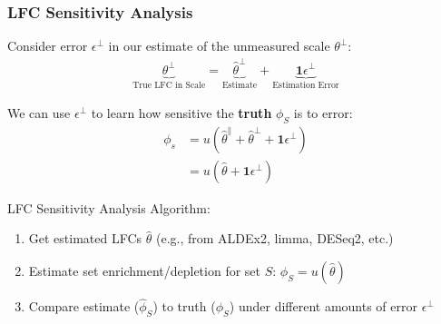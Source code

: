 \documentclass[11pt]{beamer}
\begin{document}
\begin{frame}
  \frametitle{LFC Sensitivity Analysis}

  Consider error \(\epsilon^\perp\) in our estimate of the unmeasured scale \(\theta^\perp\):
  \begin{align*}
    \underbrace{\theta^\perp}_{\text{True LFC in Scale}} = \underbrace{\hat{\theta}^\perp}_{\text{Estimate}} + \underbrace{\pmb{1}\epsilon^\perp}_{\text{Estimation Error}}
  \end{align*}

  \pause
  
    We can use \(\epsilon^\perp\) to learn how sensitive the \textbf{truth} \(\phi_S\) is to error:
    \begin{align*}
      \phi_s &= u(\hat{\theta}^\parallel+ \hat{\theta}^\perp + \pmb{1}\epsilon^\perp) \\
           &= u(\hat{\theta}+\pmb{1}\epsilon^\perp)
    \end{align*}
  
  \pause

  LFC Sensitivity Analysis Algorithm:
  \begin{enumerate}
      \item Get estimated LFCs \(\hat{\theta}\) (e.g., from ALDEx2, limma, DESeq2, etc.)
      \item Estimate set enrichment/depletion for set \(S\): \(\hat{\phi}_S=u(\hat{\theta})\)
      \item Compare estimate (\(\hat{\phi}_S\)) to truth (\(\phi_S\)) under different amounts of error \(\epsilon^\perp\)
  \end{enumerate}

\end{frame}
\end{document}
